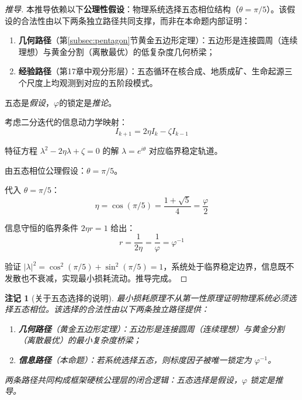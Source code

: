 \documentclass[12pt,a4paper,twocolumn]{article}
\renewcommand{\phi}{\varphi}
\newtheorem{remark}[theorem]{注记}
\begin{document}
\begin{proof}[推导]
本推导依赖以下\textbf{公理性假设}：物理系统选择五态相位结构（$\theta=\pi/5$）。该假设的合法性由以下两条独立路径共同支撑，而非在本命题内部证明：
\begin{enumerate}
\item \textbf{几何路径}（第\ref{subsec:pentagon}节黄金五边形定理）：五边形是连接圆周（连续理想）与黄金分割（离散最优）的低复杂度几何桥梁；
\item \textbf{经验路径}（第17章中观分形层）：五态循环在核合成、地质成矿、生命起源三个尺度上均观测到对应的五阶段模式。
\end{enumerate}
五态是\emph{假设}，$\phi$的锁定是\emph{推论}。

考虑二分迭代的信息动力学映射：
\begin{equation}
I_{k+1} = 2\eta I_k - \zeta I_{k-1}
\end{equation}

特征方程 $\lambda^2 - 2\eta\lambda + \zeta = 0$ 的解 $\lambda = e^{i\theta}$ 对应临界稳定轨道。

由五态相位公理假设：$\theta = \pi/5$。

代入 $\theta = \pi/5$：
\begin{equation}
\eta = \cos(\pi/5) = \frac{1+\sqrt{5}}{4} = \frac{\phi}{2}
\end{equation}

信息守恒的临界条件 $2\eta r = 1$ 给出：
\begin{equation}
r = \frac{1}{2\eta} = \frac{1}{\phi} = \phi^{-1}
\end{equation}

验证 $|\lambda|^2 = \cos^2(\pi/5) + \sin^2(\pi/5) = 1$，系统处于临界稳定边界，信息既不发散也不衰减，实现最小损耗流动。推导完成。
\end{proof}

\begin{remark}[关于五态选择的说明]
最小损耗原理\emph{不}从第一性原理证明物理系统\emph{必须}选择五态相位。该选择的合法性由以下两条独立路径提供：
\begin{enumerate}
\item \textbf{几何路径}（黄金五边形定理）：五边形是连接圆周（连续理想）与黄金分割（离散最优）的最小复杂度桥梁；
\item \textbf{信息路径}（本命题）：若系统选择五态，则标度因子被唯一锁定为 $\phi^{-1}$。
\end{enumerate}
两条路径共同构成框架硬核公理层的闭合逻辑：五态选择是\emph{假设}，$\phi$ 锁定是\emph{推导}。
\end{remark}
\end{document}

